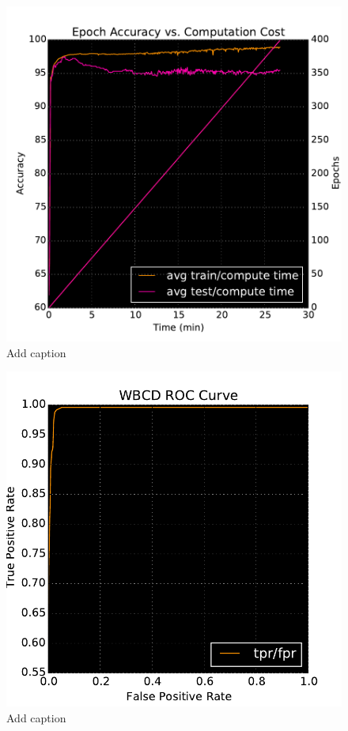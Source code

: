 \begin{figure}[t]

\centering
\includegraphics[width=0.95\columnwidth]{figs/wbcd_timing_iterative}
\caption {Add caption}
\label{fig:wbcd_iterative_timing}

\end{figure}


\begin{figure}[t]

\centering
\includegraphics[width=0.95\columnwidth]{figs/wbcd_roc}
\caption {Add caption}
\label{fig:wbcd_roc}

\end{figure}


